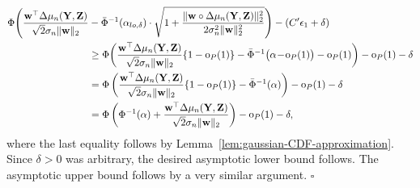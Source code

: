 \documentclass[12pt]{article}
\newcommand{\bY}{\mathbf{Y}}
\newcommand{\bZ}{\mathbf{Z}}
\newcommand{\bw}{\mathbf{w}}
\begin{document}
\begin{align*}
        \Phi\Biggl(\frac{\bw^\top\Delta\mu_n(\bY,\bZ)}{\sqrt{2}\sigma_n\|\bw\|_2} &-  \bar\Phi^{-1}(\alpha_{\rm{lo},\delta}) \cdot\sqrt{1 +\frac{ \|\bw\circ\Delta\mu_n(\bY,\bZ)\|^2_2}{2\sigma_n^2\|\bw\|^2_2}}\Biggr)-(C'\epsilon_1+\delta) \\
        &\geq \Phi\biggl(\frac{\bw^\top\Delta\mu_n(\bY,\bZ)}{\sqrt{2}\sigma_n\|\bw\|_2}\{1-\mathrm{o}_P(1)\} -  \bar\Phi^{-1}\bigl(\alpha \!-\! \mathrm{o}_P(1)\bigr)-\mathrm{o}_P(1)\biggr) - \mathrm{o}_P(1)- \delta\\
         &=\Phi\left(\frac{\bw^\top\Delta\mu_n(\bY,\bZ)}{\sqrt{2}\sigma_n\|\bw\|_2}\{1-\mathrm{o}_P(1)\}-  \bar\Phi^{-1}(\alpha)\right) - \mathrm{o}_P(1)- \delta\\
         &=\Phi\left(\Phi^{-1}(\alpha)+\frac{\bw^\top\Delta\mu_n(\bY,\bZ)}{\sqrt{2}\sigma_n\|\bw\|_2}\right) - \mathrm{o}_P(1)- \delta,
    \end{align*}
    where the last equality follows by Lemma~\ref{lem:gaussian-CDF-approximation}.
    Since $\delta>0$ was arbitrary, the desired asymptotic lower bound follows. The asymptotic upper bound follows by a very similar argument.
\hfill $\square$
\end{document}
